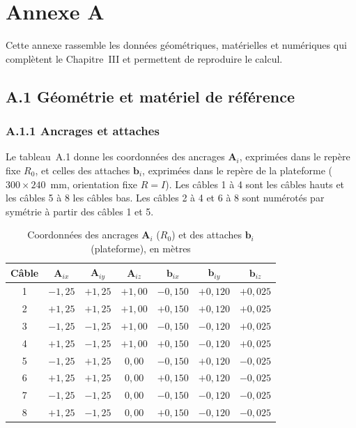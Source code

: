 \clearpage
\setcounter{page}{11}

\chapter*{Annexe A}
\thispagestyle{plain}
\markboth{}{}
\setcounter{table}{0}
\renewcommand{\thetable}{A.\arabic{table}}

Cette annexe rassemble les données géométriques, matérielles et numériques qui complètent le Chapitre~III et permettent de reproduire le calcul.

\section*{A.1 Géométrie et matériel de référence}

\subsection*{A.1.1 Ancrages et attaches}

Le tableau~A.1 donne les coordonnées des ancrages $\mathbf{A}_i$, exprimées dans le repère fixe $R_0$, et celles des attaches $\mathbf{b}_i$, exprimées dans le repère de la plateforme ($300 \times 240$~mm, orientation fixe $R = I$). Les câbles 1 à 4 sont les câbles hauts et les câbles 5 à 8 les câbles bas. Les câbles 2 à 4 et 6 à 8 sont numérotés par symétrie à partir des câbles 1 et 5.

\begin{table}[H]
\centering
\caption{Coordonnées des ancrages $\mathbf{A}_i$ ($R_0$) et des attaches $\mathbf{b}_i$ (plateforme), en mètres}
\label{tab:A1}
\footnotesize
\begin{tabular}{|c|c|c|c|c|c|c|}
\hline
\textbf{Câble} & $\mathbf{A}_{ix}$ & $\mathbf{A}_{iy}$ & $\mathbf{A}_{iz}$ & $\mathbf{b}_{ix}$ & $\mathbf{b}_{iy}$ & $\mathbf{b}_{iz}$ \\
\hline
1 & $-1{,}25$ & $+1{,}25$ & $+1{,}00$ & $-0{,}150$ & $+0{,}120$ & $+0{,}025$ \\
\hline
2 & $+1{,}25$ & $+1{,}25$ & $+1{,}00$ & $+0{,}150$ & $+0{,}120$ & $+0{,}025$ \\
\hline
3 & $-1{,}25$ & $-1{,}25$ & $+1{,}00$ & $-0{,}150$ & $-0{,}120$ & $+0{,}025$ \\
\hline
4 & $+1{,}25$ & $-1{,}25$ & $+1{,}00$ & $+0{,}150$ & $-0{,}120$ & $+0{,}025$ \\
\hline
5 & $-1{,}25$ & $+1{,}25$ & $0{,}00$ & $-0{,}150$ & $+0{,}120$ & $-0{,}025$ \\
\hline
6 & $+1{,}25$ & $+1{,}25$ & $0{,}00$ & $+0{,}150$ & $+0{,}120$ & $-0{,}025$ \\
\hline
7 & $-1{,}25$ & $-1{,}25$ & $0{,}00$ & $-0{,}150$ & $-0{,}120$ & $-0{,}025$ \\
\hline
8 & $+1{,}25$ & $-1{,}25$ & $0{,}00$ & $+0{,}150$ & $-0{,}120$ & $-0{,}025$ \\
\hline
\end{tabular}
\end{table}


